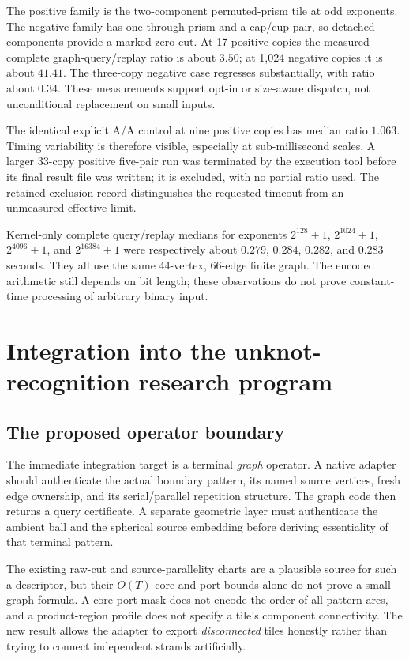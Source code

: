\documentclass[11pt]{article}
\theoremstyle{remark}\newtheorem{remark}[theorem]{Remark}
\begin{document}
The positive family is the two-component permuted-prism tile at odd exponents. The negative family has one through prism and a cap/cup pair, so detached components provide a marked zero cut. At 17 positive copies the measured complete graph-query/replay ratio is about $3.50$; at 1,024 negative copies it is about $41.41$. The three-copy negative case regresses substantially, with ratio about $0.34$. These measurements support opt-in or size-aware dispatch, not unconditional replacement on small inputs.

The identical explicit A/A control at nine positive copies has median ratio $1.063$. Timing variability is therefore visible, especially at sub-millisecond scales. A larger 33-copy positive five-pair run was terminated by the execution tool before its final result file was written; it is excluded, with no partial ratio used. The retained exclusion record distinguishes the requested timeout from an unmeasured effective limit.

Kernel-only complete query/replay medians for exponents $2^{128}+1$, $2^{1024}+1$, $2^{4096}+1$, and $2^{16384}+1$ were respectively about $0.279$, $0.284$, $0.282$, and $0.283$ seconds. They all use the same 44-vertex, 66-edge finite graph. The encoded arithmetic still depends on bit length; these observations do not prove constant-time processing of arbitrary binary input.

\section{Integration into the unknot-recognition research program}
\subsection{The proposed operator boundary}
The immediate integration target is a terminal \emph{graph} operator. A native adapter should authenticate the actual boundary pattern, its named source vertices, fresh edge ownership, and its serial/parallel repetition structure. The graph code then returns a query certificate. A separate geometric layer must authenticate the ambient ball and the spherical source embedding before deriving essentiality of that terminal pattern.

The existing raw-cut and source-parallelity charts are a plausible source for such a descriptor, but their $O(T)$ core and port bounds alone do not prove a small graph formula. A core port mask does not encode the order of all pattern arcs, and a product-region profile does not specify a tile's component connectivity. The new result allows the adapter to export \emph{disconnected} tiles honestly rather than trying to connect independent strands artificially.
\end{document}
